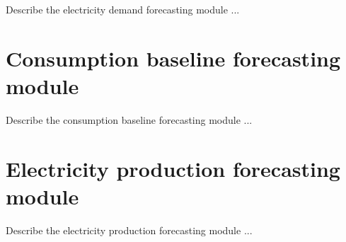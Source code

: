 Describe the electricity demand forecasting module ...


\section{Consumption baseline forecasting module}
\label{sec:baselinemodel}
\vspace{0.2 cm}

Describe the consumption baseline forecasting module ...


\section{Electricity production forecasting module}
\label{sec:productionmodel}
\vspace{0.2 cm}

Describe the electricity production forecasting module ...
